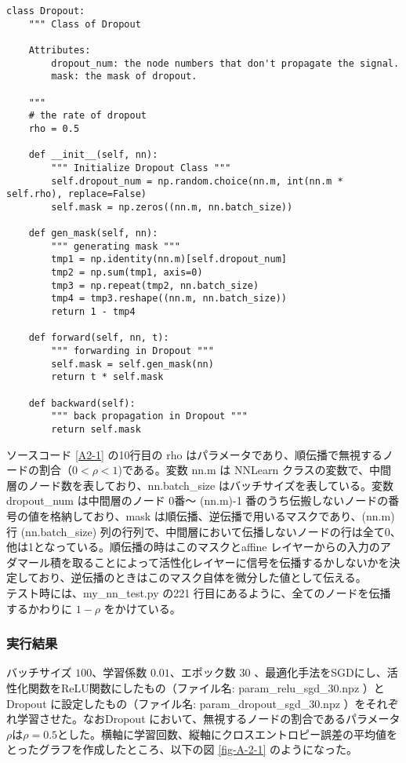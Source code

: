\documentclass[a4paper,dvipdfmx]{jsarticle}
\begin{document}
\begin{lstlisting}[caption="クラス Dropout ",label=A2-1]
class Dropout:
    """ Class of Dropout

    Attributes:
        dropout_num: the node numbers that don't propagate the signal.
        mask: the mask of dropout.

    """
    # the rate of dropout
    rho = 0.5

    def __init__(self, nn):
        """ Initialize Dropout Class """
        self.dropout_num = np.random.choice(nn.m, int(nn.m * self.rho), replace=False)
        self.mask = np.zeros((nn.m, nn.batch_size))

    def gen_mask(self, nn):
        """ generating mask """
        tmp1 = np.identity(nn.m)[self.dropout_num]
        tmp2 = np.sum(tmp1, axis=0)
        tmp3 = np.repeat(tmp2, nn.batch_size)
        tmp4 = tmp3.reshape((nn.m, nn.batch_size))
        return 1 - tmp4

    def forward(self, nn, t):
        """ forwarding in Dropout """
        self.mask = self.gen_mask(nn)
        return t * self.mask

    def backward(self):
        """ back propagation in Dropout """
        return self.mask
\end{lstlisting}

ソースコード \ref{A2-1} の10行目の rho はパラメータであり、順伝播で無視するノードの割合（$ 0 < \rho < 1$)である。変数 nn.m は NNLearn クラスの変数で、中間層のノード数を表しており、nn.batch\_size はバッチサイズを表している。変数  dropout\_num は中間層のノード 0番〜 (nn.m)-1 番のうち伝搬しないノードの番号の値を格納しており、mask は順伝播、逆伝播で用いるマスクであり、(nn.m) 行 
 (nn.batch\_size) 列の行列で、中間層において伝播しないノードの行は全て0、他は1となっている。順伝播の時はこのマスクとaffine レイヤーからの入力のアダマール積を取ることによって活性化レイヤーに信号を伝播するかしないかを決定しており、逆伝播のときはこのマスク自体を微分した値として伝える。\\
 
 テスト時には、my\_nn\_test.py の221 行目にあるように、全てのノードを伝播するかわりに $1-\rho$ をかけている。
 
 \subsubsection*{実行結果}
 
バッチサイズ $100$、学習係数 $0.01$、エポック数 $30$ 、最適化手法をSGDにし、活性化関数をReLU関数にしたもの（ファイル名: param\_relu\_sgd\_30.npz ）とDropout に設定したもの（ファイル名: param\_dropout\_sgd\_30.npz ）をそれぞれ学習させた。なおDropout において、無視するノードの割合であるパラメータ$\rho$は$\rho = 0.5$とした。横軸に学習回数、縦軸にクロスエントロピー誤差の平均値をとったグラフを作成したところ、以下の図 \ref{fig-A-2-1} のようになった。
\end{document}
